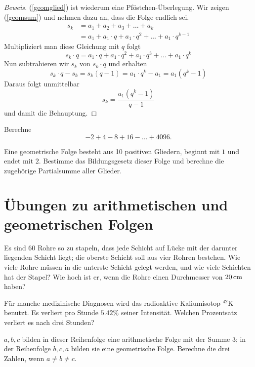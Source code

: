 \documentclass[%
11pt,%
twoside,%
titlepage,%
german,%
headsepline%
]{scrartcl}
\begin{document}
\begin{proof}[Beweis]
(\ref{geomglied}) ist wiederum eine \glqq Pf\"ostchen-\"Uberlegung\grqq. Wir zeigen (\ref{geomsum}) und nehmen dazu an, dass die Folge endlich sei.
\begin{align*}
s_k&=a_1+a_2+a_3+\ldots+a_k\\
&=a_1+a_1\cdot q+a_1\cdot q^2+\ldots+a_1\cdot q^{k-1}
\end{align*}
Multipliziert man diese Gleichung mit $q$ folgt
$$s_k\cdot q=a_1\cdot q+a_1\cdot q^2+a_1\cdot q^3+\ldots+a_1\cdot q^k$$
Nun subtrahieren wir $s_k$ von $s_k\cdot q$ und erhalten
$$s_k\cdot q-s_k=s_k(q-1)=a_1\cdot q^k-a_1=a_1(q^k-1)$$
Daraus folgt unmittelbar
$$s_k=\frac{a_1(q^k-1)}{q-1}$$
und damit die Behauptung.
\end{proof}

\begin{ueb}[Zweierpotenzen]
Berechne
$$-2+4-8+16-\dots+4096.$$
\end{ueb}

\begin{ueb}
Eine geometrische Folge besteht aus 10 positiven Gliedern, beginnt mit $1$ und endet mit $2$. Bestimme das Bildungsgesetz dieser Folge und berechne die zugeh\"orige Partialsumme aller Glieder.
\end{ueb}

\section{\"Ubungen zu arithmetischen und geometrischen Folgen}

\begin{ueb}
Es sind 60 Rohre so zu stapeln, dass jede Schicht auf L\"ucke mit der darunter liegenden Schicht liegt; die oberste Schicht soll aus vier Rohren bestehen. Wie viele Rohre m\"ussen in die unterste Schicht gelegt werden, und wie viele Schichten hat der Stapel? Wie hoch ist er, wenn die Rohre einen Durchmesser von $\unit[20]{cm}$ haben?
\end{ueb}

\begin{ueb}[Kalium]
F\"ur manche medizinische Diagnosen wird das radioaktive Kaliumisotop $^{42}$K benutzt. Es verliert pro Stunde $5.42\%$ seiner Intensit\"at. Welchen Prozentsatz verliert es nach drei Stunden?
\end{ueb}

\begin{ueb}[AF und GF]
$a, b, c$ bilden in dieser Reihenfolge eine arithmetische Folge mit der Summe $3$; in der Reihenfolge $b, c, a$ bilden sie eine geometrische Folge. Berechne die drei Zahlen, wenn $a\neq b\neq c$.
\end{ueb}
\end{document}
